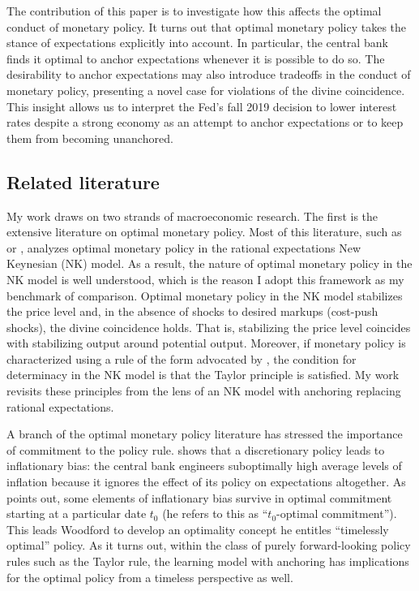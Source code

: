 \documentclass[11pt]{article}
\renewcommand{\[}{\begin{equation}}
\renewcommand{\]}{\end{equation}}
\begin{document}
The contribution of this paper is to investigate how this affects the optimal conduct of monetary policy. It turns out that optimal monetary policy takes the stance of expectations explicitly into account. In particular, the central bank finds it optimal to anchor expectations whenever it is possible to do so. The desirability to anchor expectations may also introduce tradeoffs in the conduct of monetary policy, presenting a novel case for violations of the divine coincidence. This insight allows us to interpret the Fed's fall 2019 decision to lower interest rates despite a strong economy as an attempt to anchor expectations or to keep them from becoming unanchored. 

\subsection{Related literature}
My work draws on two strands of macroeconomic research. The first is the extensive literature on optimal monetary policy. Most of this literature, such as \cite{clarida1999science} or \cite{woodford2011interest}, analyzes optimal monetary policy in the rational expectations New Keynesian (NK) model. As a result, the nature of optimal monetary policy in the NK model is well understood, which is the reason I adopt this framework as my benchmark of comparison. Optimal monetary policy in the NK model stabilizes the price level and, in the absence of shocks to desired markups (cost-push shocks), the divine coincidence holds. That is, stabilizing the price level coincides with stabilizing output around potential output. Moreover, if monetary policy is characterized using a rule of the form advocated by \cite{Taylor1993discretion}, the condition for determinacy in the NK model is that the Taylor principle is satisfied. My work revisits these principles from the lens of an NK model with anchoring replacing rational expectations.

A branch of the optimal monetary policy literature has stressed the importance of commitment to the policy rule. \cite{kydland1977rules} shows that a discretionary policy leads to inflationary bias: the central bank engineers suboptimally high average levels of inflation because it ignores the effect of its policy on expectations altogether. As \cite{woodford2011interest} points out, some elements of inflationary bias survive in optimal commitment starting at a particular date $t_0$ (he refers to this as ``$t_0$-optimal commitment''). This leads Woodford to develop an optimality concept he entitles ``timelessly optimal'' policy. As it turns out, within the class of purely forward-looking policy rules such as the Taylor rule, the learning model with anchoring has implications for the optimal policy from a timeless perspective as well.
\end{document}
